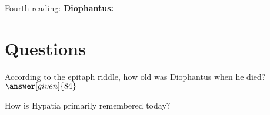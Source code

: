 \documentclass[nooutcomes]{ximera}
\begin{document}
Fourth reading: {\bf Diophantus:} 

\section{Questions}

\begin{question}
According to the epitaph riddle, how old was Diophantus when he died? $\answer[given]{84}$
\end{question}

\begin{question}
How is Hypatia primarily remembered today?
\begin{multipleChoice}
\end{multipleChoice}
\end{question}


%
\end{document}
